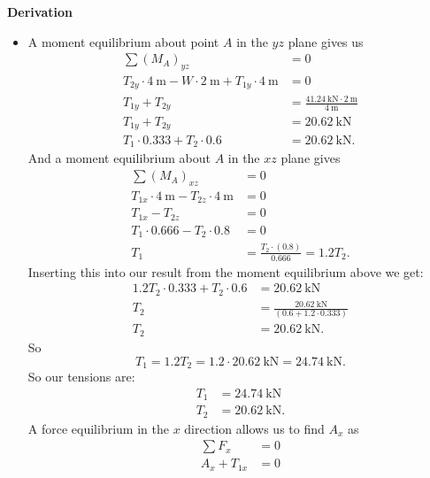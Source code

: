 \documentclass[a4paper]{article}
\numberwithin{equation}{problem}
\newcommand{\AUheading}[1]{%
  \par\vspace{.4\baselineskip}%
  {\sffamily\bfseries\color{AUblueDark}#1\par}%
  \nobreak%
}
\newenvironment{derivation}[1][Derivation]{%
  \AUheading{#1}
  \begingroup\allowdisplaybreaks
  \setlength{\abovedisplayskip}{6pt}%
  \setlength{\belowdisplayskip}{6pt}%
  \setlength{\abovedisplayshortskip}{4pt}%
  \setlength{\belowdisplayshortskip}{4pt}%
}{\par\endgroup\medskip}
\begin{document}
\begin{derivation}
\begin{itemize}
      \item[Q1.4] A moment equilibrium about point $A$ in the $yz$ plane gives us
        \begin{align*}
          \sum \left( M_A \right)_{yz} &= 0 \\
          T_{2y} \cdot \qty{4}{\m} - W \cdot \qty{2}{\m} + T_{1y} \cdot \qty{4}{\m} &= 0 \\
          T_{1y} + T_{2y} &= \frac{\qty{41,24}{\kN} \cdot \qty{2}{\m} }{\qty{4}{\m} } \\
          T_{1y} + T_{2y} &=\qty{20,62}{\kN} \\
          T_1 \cdot \num{0,333} + T_2 \cdot \num{0,6} &= \qty{20,62}{\kN} 
      .\end{align*}
      And a moment equilibrium about $A$ in the $xz$ plane gives
      \begin{align*}
        \sum \left( M_A \right)_{xz} &= 0 \\
        T_{1x} \cdot \qty{4}{\m} - T_{2z} \cdot \qty{4}{\m} &= 0 \\
        T_{1x} - T_{2z} &= 0 \\
        T_1 \cdot \num{0,666} - T_2 \cdot \num{0,8} &= 0 \\
        T_1 &= \frac{T_2 \cdot (\num{0,8})}{\num{0,666}}  =  \num{1,2} T_2
      .\end{align*}
      Inserting this into our result from the moment equilibrium above we get:
      \begin{align*}
         \num{1,2} T_2 \cdot \num{0,333} + T_2 \cdot \num{0,6} &= \qty{20,62}{\kN}  \\
        T_2 &= \frac{\qty{20,62}{\kN}}{\left( \num{0,6} + \num{1,2} \cdot \num{0,333}  \right)} \\
        T_2 &= \qty{20,62}{\kN} 
      .\end{align*}
      So
      \begin{equation*}
        T_1 = \num{1,2} T_2 = \num{1,2} \cdot \qty{20,62}{\kN} = \qty{24,74}{\kN} 
      .\end{equation*}
      So our tensions are:
      \begin{align*}
        T_1 &= \qty{24,74}{\kN}  \\
        T_2 &= \qty{20,62}{\kN}
      .\end{align*}
      A force equilibrium in the $x$ direction allows us to find $A_x$ as
      \begin{align*}
        \sum F_x &= 0 \\
        A_x + T_{1x} &= 0 \\

\end{align*}
\end{itemize}
\end{derivation}
\end{document}

